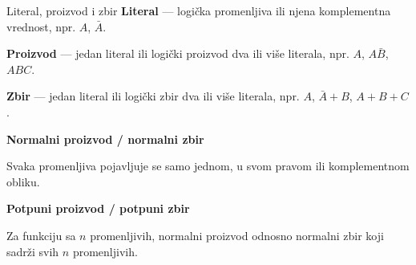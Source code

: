 \begin{frame}[label=02-s009]{Literal, proizvod i zbir}
\textbf{Literal} — logička promenljiva ili njena komplementna vrednost, npr. \(A\), \(\bar A\).
\par\vspace{2mm}
\textbf{Proizvod} — jedan literal ili logički proizvod dva ili više literala, npr. \(A\), \(A\bar B\), \(ABC\).
\par\vspace{2mm}
\textbf{Zbir} — jedan literal ili logički zbir dva ili više literala, npr. \(A\), \(\bar A+B\), \(A+B+C\).
\par\vspace{3mm}
\textbf{Normalni proizvod / normalni zbir}\par
Svaka promenljiva pojavljuje se samo jednom, u svom pravom ili komplementnom obliku.
\par\vspace{3mm}
\textbf{Potpuni proizvod / potpuni zbir}\par
Za funkciju sa \(n\) promenljivih, normalni proizvod odnosno normalni zbir koji sadrži svih \(n\) promenljivih.
\end{frame}
